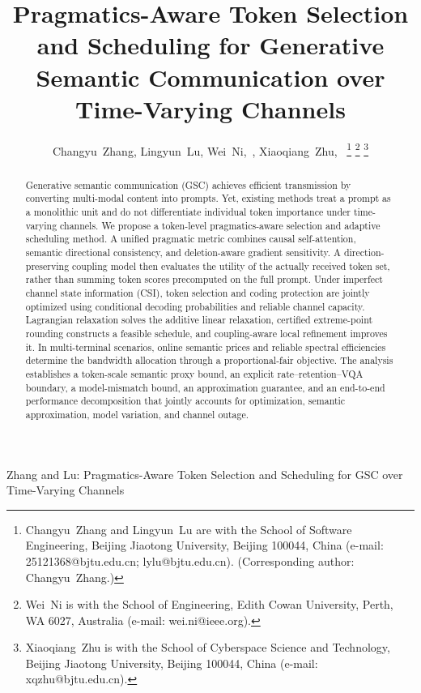 \documentclass[journal]{IEEEtran}
\begin{document}
\title{Pragmatics-Aware Token Selection and Scheduling for Generative Semantic Communication over Time-Varying Channels}

\author{Changyu~Zhang, Lingyun~Lu, Wei~Ni,~, Xiaoqiang~Zhu,~
\thanks{Changyu~Zhang and Lingyun~Lu are with the School of Software Engineering, Beijing Jiaotong University, Beijing 100044, China (e-mail: 25121368@bjtu.edu.cn; lylu@bjtu.edu.cn). (Corresponding author: Changyu~Zhang.)}
\thanks{Wei~Ni is with the School of Engineering, Edith Cowan University, Perth, WA 6027, Australia (e-mail: wei.ni@ieee.org).}
\thanks{Xiaoqiang~Zhu is with the School of Cyberspace Science and Technology, Beijing Jiaotong University, Beijing 100044, China (e-mail: xqzhu@bjtu.edu.cn).}}

%
{Zhang and Lu: Pragmatics-Aware Token Selection and Scheduling for GSC over Time-Varying Channels}

\maketitle

\begin{abstract}
Generative semantic communication (GSC) achieves efficient transmission by converting multi-modal content into prompts. Yet, existing methods treat a prompt as a monolithic unit and do not differentiate individual token importance under time-varying channels. We propose a token-level pragmatics-aware selection and adaptive scheduling method. A unified pragmatic metric combines causal self-attention, semantic directional consistency, and deletion-aware gradient sensitivity. A direction-preserving coupling model then evaluates the utility of the actually received token set, rather than summing token scores precomputed on the full prompt. Under imperfect channel state information (CSI), token selection and coding protection are jointly optimized using conditional decoding probabilities and reliable channel capacity. Lagrangian relaxation solves the additive linear relaxation, certified extreme-point rounding constructs a feasible schedule, and coupling-aware local refinement improves it. In multi-terminal scenarios, online semantic prices and reliable spectral efficiencies determine the bandwidth allocation through a proportional-fair objective. The analysis establishes a token-scale semantic proxy bound, an explicit rate--retention--VQA boundary, a model-mismatch bound, an approximation guarantee, and an end-to-end performance decomposition that jointly accounts for optimization, semantic approximation, model variation, and channel outage.
\end{abstract}
\end{document}
